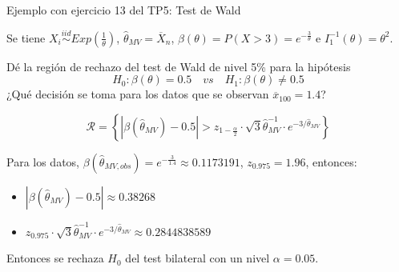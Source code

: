\documentclass{beamer}
\theoremstyle{definition}
\begin{document}
\begin{frame}{\color{rosee}Ejemplo con ejercicio 13 del TP5: Test de Wald}\small
  
Se tiene $X_i\stackrel{iid}{\sim}Exp\left(\frac{1}{\theta}\right)$, $\widehat{\theta}_{MV}=\overline{X}_n$, $\beta(\theta)=P(X>3)=e^{-\frac{3}{\theta}}$ e $I_1^{-1}(\theta)=\theta^2$. 

Dé la región de rechazo del test de Wald de nivel 5\% para la hipótesis $$H_0: \beta(\theta)=0.5 \quad vs \quad H_1: \beta(\theta)\neq 0.5$$ 
 ¿Qué decisión se toma para los datos que se observan $\overline{x}_{100}=1.4$? 

 \color{gray}
\[\mathcal{R}=\left\{\left|\beta(\widehat{\theta}_{MV})-0.5\right|>z_{1-\frac{\alpha}{2}}\cdot \sqrt{3}\widehat{\theta}_{MV}^{-1}\cdot e^{-3/\widehat{\theta}_{MV}}\right\}\]

Para los datos, $\beta(\widehat{\theta}_{MV,obs})=e^{-\frac{3}{1.4}}\approx 0.1173191$, $z_{0.975}=1.96$, entonces:
\begin{itemize}
    \item $\left|\beta(\widehat{\theta}_{MV})-0.5\right|\approx 0.38268$
    \item $z_{0.975}\cdot \sqrt{3}\widehat{\theta}_{MV}^{-1}\cdot e^{-3/\widehat{\theta}_{MV}}\approx 0.2844838589$
\end{itemize}

Entonces se rechaza $H_0$ del test bilateral con un nivel $\alpha=0.05$.
\color{black}

  
  
\end{frame}
\end{document}
